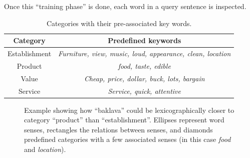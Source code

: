 \documentclass[a4paper,11pt]{kth-mag}
\begin{document}
Once this ``training phase'' is done, each word in a query sentence is inspected.


\begin{table}[t]
  \centering
  \begin{tabular}{| c | c |}
    \hline
    \textbf{Category} & \textbf{Predefined keywords}\\ \hline
    Establishment & \emph{Furniture, view, music, loud, appearance, clean, location}\\ \hline
    Product & \emph{food, taste, edible}\\ \hline
    Value & \emph{Cheap, price, dollar, buck, lots, bargain}\\ \hline
    Service & \emph{Service, quick, attentive}\\ \hline
  \end{tabular}
  \caption{Categories with their pre-associated key words.}
  \label{cat_words}
\end{table}

\begin{figure}[t]
  \centering
  \caption{Example showing how ``baklava'' could be lexicographically closer to category ``product'' than ``establishment''. Ellipses represent word senses, rectangles the relations between senses, and diamonds predefined categories with a few associated senses (in this case \emph{food} and \emph{location}).}
  \label{fig:baklava_lex}
\end{figure}
\end{document}
